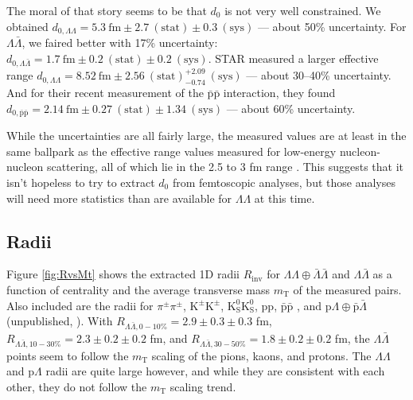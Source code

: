 The moral of that story seems to be that $d_0$ is not very well constrained. 
We obtained $d_{0,\Lambda\Lambda} =  5.3\ \mathrm{fm} \pm 2.7\ \mathrm{(stat)} \pm 0.3\ \mathrm{(sys)}$ --- about 50\% uncertainty.
For $\Lambda\bar{\Lambda}$, we faired better with 17\% uncertainty: $d_{0,\Lambda\bar{\Lambda}} =  1.7\ \mathrm{fm} \pm 0.2\ \mathrm{(stat)} \pm 0.2\ \mathrm{(sys)}$.
STAR measured a larger effective range $d_{0,\Lambda\Lambda} =  8.52\ \mathrm{fm} \pm 2.56\ \mathrm{(stat)}^{+2.09}_{-0.74}\ \mathrm{(sys)}$ --- about 30--40\% uncertainty.
And for their recent measurement of the $\mathrm{\bar{p}\bar{p}}$ interaction, they found $d_{0,\bar{\mathrm{p}}\bar{\mathrm{p}}} = 2.14\ \mathrm{fm} \pm 0.27\ \mathrm{(stat)} \pm 1.34\ \mathrm{(sys)}$ --- about 60\% uncertainty. 

While the uncertainties are all fairly large, the measured values are at least in the same ballpark as the effective range values measured for low-energy nucleon-nucleon scattering, all of which lie in the 2.5 to 3 fm range \cite{Noyes:1973zd}.
This suggests that it isn't hopeless to try to extract $d_0$ from femtoscopic analyses, but those analyses will need more statistics than are available for $\Lambda\Lambda$ at this time.

\subsection{Radii}

Figure \ref{fig:RvsMt} shows the extracted 1D radii $R_{\mathrm{inv}}$ for $\Lambda\Lambda\oplus\bar{\Lambda}\bar{\Lambda}$ and $\Lambda\bar{\Lambda}$ as a function of centrality and the average transverse mass $m_{\mathrm{T}}$ of the measured pairs.
Also included are the radii for $\pi^\pm\pi^\pm$, $\mathrm{K^\pm}\mathrm{K^\pm}$, $\mathrm{K^0_S}\mathrm{K^0_S}$, pp, $\bar{\mathrm{p}}\bar{\mathrm{p}}$ \cite{Adam:2015vja}, and p$\Lambda\oplus\bar{\mathrm{p}}\bar{\Lambda}$ (unpublished, \cite{Beck:2015msi}).
With $R_{\Lambda\bar{\Lambda},0-10\%} = 2.9\pm 0.3 \pm 0.3$ fm, $R_{\Lambda\bar{\Lambda},10-30\%} = 2.3\pm 0.2 \pm 0.2$ fm, and $R_{\Lambda\bar{\Lambda},30-50\%} = 1.8\pm 0.2 \pm 0.2$ fm, the $\Lambda\bar{\Lambda}$ points seem to follow the $m_\mathrm{T}$ scaling of the pions, kaons, and protons.
The $\Lambda\Lambda$ and p$\Lambda$ radii are quite large however, and while they are consistent with each other, they do not follow the $m_\mathrm{T}$ scaling trend.




